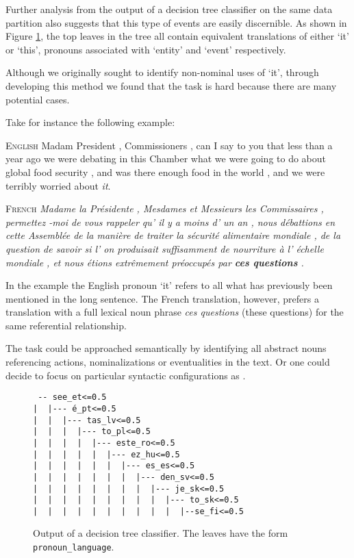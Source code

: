 \documentclass[10pt, a4paper]{article} \usepackage{lrec} \usepackage{multibib}
\begin{document}
Further analysis from the output of a decision tree classifier on the same data partition also suggests that this type of events are easily discernible. As shown in Figure \ref{fig:decisiontree}, the top leaves in the tree all contain equivalent translations of either `it' or `this', pronouns associated with `entity' and `event' respectively. 

Although we originally sought to identify non-nominal uses of `it', through developing this method we found that the task is hard because there are many potential
cases. 

Take for instance the following example:

\vspace{1em}

\textsc{English} Madam President , Commissioners , can I say to you that less than a year ago we were debating in this Chamber what we were going to do about global food security , and was there enough food in the world , and we were terribly worried about \textit{it}.

\textsc{French} \textit{Madame la Présidente , Mesdames et Messieurs les Commissaires , permettez -moi de vous rappeler qu' il y a moins d' un an , nous débattions en cette Assemblée de la manière de traiter la sécurité alimentaire mondiale , de la question de savoir si l' on produisait suffisamment de nourriture à l' échelle mondiale , et nous étions extrêmement préoccupés par \textbf{ces questions} .}

\vspace{1em}

In the example the English pronoun `it' refers to all what has previously been mentioned in the long sentence. The French translation, however, prefers a translation with a full lexical noun phrase \textit{ces questions} (these questions) for the same referential relationship. 

The task could be approached semantically by identifying all abstract
nouns referencing actions, nominalizations or eventualities in the text. Or one
could decide to focus on particular syntactic configurations as
.

\begin{figure}
\begin{verbatim}
 -- see_et<=0.5
|  |--- é_pt<=0.5
|  |  |--- tas_lv<=0.5
|  |  |  |--- to_pl<=0.5
|  |  |  |  |--- este_ro<=0.5
|  |  |  |  |  |--- ez_hu<=0.5
|  |  |  |  |  |  |--- es_es<=0.5
|  |  |  |  |  |  |  |--- den_sv<=0.5
|  |  |  |  |  |  |  |  |--- je_sk<=0.5
|  |  |  |  |  |  |  |  |  |--- to_sk<=0.5
|  |  |  |  |  |  |  |  |  |  |--se_fi<=0.5
\end{verbatim}
\caption{Output of a decision tree classifier. The leaves have the form \texttt{pronoun\_language}.}\label{fig:decisiontree}
\end{figure}
\end{document}
